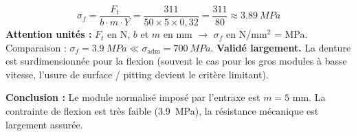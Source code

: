 \documentclass[11pt]{article}
\begin{document}
\begin{exoresolu}
\begin{enumerate}
\begin{itemize}
              \end{itemize}
              \[
              \sigma_f = \frac{F_t}{b \cdot m \cdot Y} = \frac{311}{50 \times 5 \times 0,32} = \frac{311}{80} \approx \SI{3,89}{MPa}
              \]
              \textbf{Attention unités :} $F_t$ en N, $b$ et $m$ en mm $\rightarrow$ $\sigma_f$ en N/mm$^2$ = MPa.
              Comparaison : $\sigma_f = \SI{3,9}{MPa} \ll \sigma_{\text{adm}} = \SI{700}{MPa}$.
              \textbf{Validé largement.} La denture est surdimensionnée pour la flexion (souvent le cas pour les gros modules à basse vitesse, l'usure de surface / pitting devient le critère limitant).
    \end{enumerate}
    \textbf{Conclusion :} Le module normalisé imposé par l'entraxe est $m = 5$ mm. La contrainte de flexion est très faible (\SI{3,9}{MPa}), la résistance mécanique est largement assurée.
\end{exoresolu}
\end{document}
